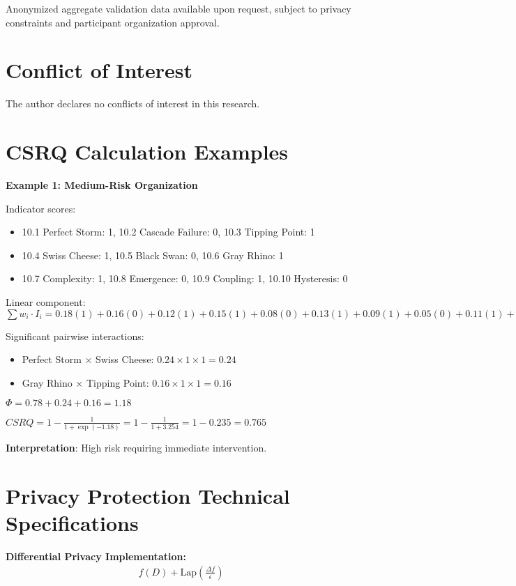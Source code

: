 \documentclass[11pt,a4paper]{article}
\begin{document}
Anonymized aggregate validation data available upon request, subject to privacy constraints and participant organization approval.

\section*{Conflict of Interest}

The author declares no conflicts of interest in this research.

\appendix

\section{CSRQ Calculation Examples}
\label{app:csrq_examples}

\textbf{Example 1: Medium-Risk Organization}

Indicator scores:
\begin{itemize}
\item 10.1 Perfect Storm: 1, 10.2 Cascade Failure: 0, 10.3 Tipping Point: 1
\item 10.4 Swiss Cheese: 1, 10.5 Black Swan: 0, 10.6 Gray Rhino: 1
\item 10.7 Complexity: 1, 10.8 Emergence: 0, 10.9 Coupling: 1, 10.10 Hysteresis: 0
\end{itemize}

Linear component: $\sum w_i \cdot I_i = 0.18(1) + 0.16(0) + 0.12(1) + 0.15(1) + 0.08(0) + 0.13(1) + 0.09(1) + 0.05(0) + 0.11(1) + 0.07(0) = 0.78$

Significant pairwise interactions:
\begin{itemize}
\item Perfect Storm × Swiss Cheese: $0.24 \times 1 \times 1 = 0.24$
\item Gray Rhino × Tipping Point: $0.16 \times 1 \times 1 = 0.16$
\end{itemize}

$\Phi = 0.78 + 0.24 + 0.16 = 1.18$

$CSRQ = 1 - \frac{1}{1 + \exp(-1.18)} = 1 - \frac{1}{1 + 3.254} = 1 - 0.235 = 0.765$

\textbf{Interpretation}: High risk requiring immediate intervention.

\section{Privacy Protection Technical Specifications}
\label{app:privacy}

\textbf{Differential Privacy Implementation:}
\begin{align}
f(D) + \text{Lap}\left(\frac{\Delta f}{\epsilon}\right)
\end{align}
\end{document}
